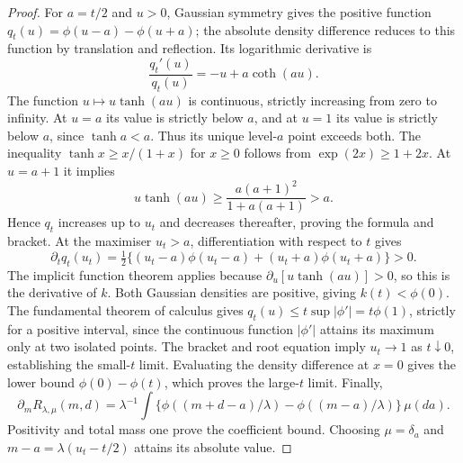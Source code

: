 \documentclass[11pt]{article}
\begin{document}
\begin{proof}
For $a=t/2$ and $u>0$, Gaussian symmetry gives the positive function
$q_t(u)=\phi(u-a)-\phi(u+a)$; the absolute density difference reduces
to this function by translation and reflection. Its logarithmic
derivative is
\begin{equation}
 \frac{q_t'(u)}{q_t(u)}=-u+a\coth(au).
 \label{eq:sharp-k-log-derivative}
\end{equation}
The function $u\mapsto u\tanh(au)$ is continuous, strictly increasing
from zero to infinity. At $u=a$ its value is strictly below $a$, and at
$u=1$ its value is strictly below $a$, since $\tanh a<a$. Thus its
unique level-$a$ point exceeds both. The inequality
$\tanh x\geq x/(1+x)$ for $x\geq0$ follows from
$\exp(2x)\geq1+2x$. At $u=a+1$ it implies
\begin{equation}
 u\tanh(au)\geq
 \frac{a(a+1)^2}{1+a(a+1)}>a.
 \label{eq:sharp-k-upper-bracket}
\end{equation}
Hence $q_t$ increases up to $u_t$ and decreases thereafter, proving
the formula and bracket. At the maximiser $u_t>a$, differentiation
with respect to $t$ gives
\begin{equation}
 \partial_t q_t(u_t)=\tfrac12\{(u_t-a)\phi(u_t-a)
                              +(u_t+a)\phi(u_t+a)\}>0.
 \label{eq:sharp-k-monotonicity}
\end{equation}
The implicit function theorem applies because
$\partial_u[u\tanh(au)]>0$, so this is the derivative of $k$.
Both Gaussian densities are positive, giving $k(t)<\phi(0)$.
The fundamental theorem of calculus gives
$q_t(u)\leq t\sup|\phi'|=t\phi(1)$, strictly for a positive interval,
since the continuous function $|\phi'|$ attains its maximum only at
two isolated points. The bracket and root equation imply $u_t\to1$
as $t\downarrow0$, establishing the small-$t$ limit. Evaluating the
density difference at $x=0$ gives the lower bound
$\phi(0)-\phi(t)$, which proves the large-$t$ limit. Finally,
\begin{equation}
 \partial_m R_{\lambda,\mu}(m,d)=\lambda^{-1}
   \int\{\phi((m+d-a)/\lambda)-\phi((m-a)/\lambda)\}\,\mu(da).
 \label{eq:sharp-common-derivative-integral}
\end{equation}
Positivity and total mass one prove the coefficient bound. Choosing
$\mu=\delta_a$ and $m-a=\lambda(u_t-t/2)$ attains its absolute value.
\end{proof}
\end{document}
